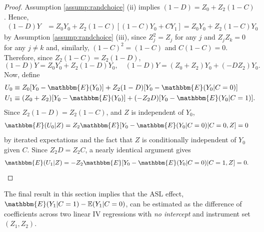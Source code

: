 \begin{appendix}
\begin{proof}
Assumption \ref{assump:randchoice} (ii) implies $(1 - D) = Z_0 + Z_2(1 - C)$. Hence, 
\begin{align*}
(1 - D)Y 
&= Z_0 Y_0 + Z_2 (1 - C) [(1 - C) Y_0 + C Y_1] = Z_0 Y_0 + Z_2 (1 - C) Y_0
\end{align*}
by Assumption \ref{assump:randchoice} (iii), since $Z_j^2 = Z_j$ for any $j$ and $Z_j Z_k = 0$ for any $j \neq k$ and, similarly, $(1 - C)^2 = (1 - C)$ and $C (1 - C) = 0$.
Therefore, since $Z_2 (1 - C) = Z_2 (1 - D)$,
\[
(1 - D)Y = Z_0 Y_0 + Z_2 (1 - D) Y_0, \quad
(1 - D)Y = (Z_0 + Z_2) Y_0 + (-DZ_2) Y_0. 
\]
Now, define 
\begin{align*}
U_0 &\equiv Z_0 [Y_0 - \mathbbm{E}(Y_0)] + Z_2(1 - D)[Y_0 - \mathbbm{E}(Y_0|C=0)]\\
U_1 &\equiv (Z_0 + Z_2)[Y_0 - \mathbbm{E}(Y_0)] + (-Z_2 D)[Y_0 - \mathbbm{E}(Y_0|C=1)].
\end{align*}
Since $Z_2(1-D) = Z_2(1 - C)$, and $Z$ is independent of $Y_0$,  
\begin{align*}
\mathbbm{E}(U_0|Z) 
&= Z_2 \mathbbm{E}[Y_0 - \mathbbm{E}(Y_0|C=0) | C = 0, Z] = 0
\end{align*}
by iterated expectations and the fact that $Z$ is conditionally independent of $Y_0$ given $C$. 
Since $Z_2 D = Z_2 C$, a nearly identical argument gives
\begin{align*}
\mathbbm{E}(U_1|Z) 
&= -Z_2 \mathbbm{E}[Y_0 - \mathbbm{E}(Y_0|C=0) | C = 1, Z] = 0. \qedhere
\end{align*}
\end{proof}


The final result in this section implies that the $\text{ASL}$ effect, $\mathbbm{E}(Y_1|C=1) - \mathbb{E}(Y_1|C=0)$, can be estimated as the difference of coefficients across two linear IV regressions with \emph{no intercept} and instrument set $(Z_1, Z_2)$.


\end{appendix}
